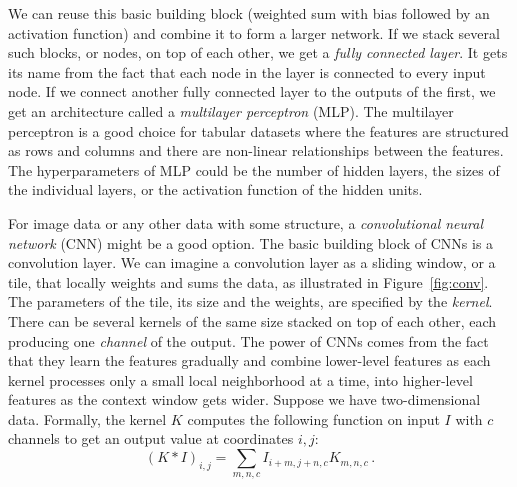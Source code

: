 
We can reuse this basic building block (weighted sum with bias followed by an activation function) and combine it to form a larger network. If we stack several such blocks, or nodes,  on top of each other, we get a \textit{fully connected layer}. It gets its name from the fact that each node in the layer is connected to every input node. If we connect another fully connected layer to the outputs of the first, we get an architecture called a \textit{multilayer perceptron} (MLP). The multilayer perceptron is a good choice for tabular datasets where the features are structured as rows and columns and there are non-linear relationships between the features. The hyperparameters of MLP could be the number of hidden layers, the sizes of the individual layers, or the activation function of the hidden units.

For image data or any other data with some structure, a \textit{convolutional neural network} (CNN) might be a good option. The basic building block of CNNs is a convolution layer. We can imagine a convolution layer as a sliding window, or a tile, that locally weights and sums the data, as illustrated in Figure~\ref{fig:conv}. The parameters of the tile, its size and the weights, are specified by the \textit{kernel}. There can be several kernels of the same size stacked on top of each other, each producing one \textit{channel} of the output. The power of CNNs comes from the fact that they learn the features gradually and combine lower-level features as each kernel processes only a small local neighborhood at a time, into higher-level features as the context window gets wider. Suppose we have two-dimensional data. Formally, the kernel $K$ computes the following function on input $I$ with $c$ channels to get an output value at coordinates $i,j$:
\[
 (K \ast I)_{i,j} =\sum_{m,n,c} I_{i+m,j+n,c}K_{m,n,c}\,.
\]


